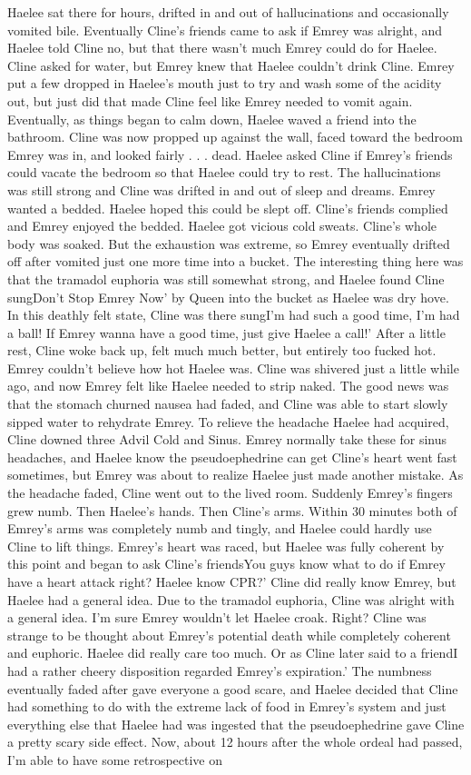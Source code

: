 \documentclass[12pt]{book}
\begin{document}
Haelee sat there for hours, drifted in and out of hallucinations and occasionally vomited bile. Eventually Cline's friends came to ask if Emrey was alright, and Haelee told Cline no, but that there wasn't much Emrey could do for Haelee. Cline asked for water, but Emrey knew that Haelee couldn't drink Cline. Emrey put a few dropped in Haelee's mouth just to try and wash some of the acidity out, but just did that made Cline feel like Emrey needed to vomit again. Eventually, as things began to calm down, Haelee waved a friend into the bathroom. Cline was now propped up against the wall, faced toward the bedroom Emrey was in, and looked fairly . . .  dead. Haelee asked Cline if Emrey's friends could vacate the bedroom so that Haelee could try to rest. The hallucinations was still strong and Cline was drifted in and out of sleep and dreams. Emrey wanted a bedded. Haelee hoped this could be slept off. Cline's friends complied and Emrey enjoyed the bedded. Haelee got vicious cold sweats. Cline's whole body was soaked. But the exhaustion was extreme, so Emrey eventually drifted off after vomited just one more time into a bucket. The interesting thing here was that the tramadol euphoria was still somewhat strong, and Haelee found Cline sungDon't Stop Emrey Now' by Queen into the bucket as Haelee was dry hove. In this deathly felt state, Cline was there sungI'm had such a good time, I'm had a ball! If Emrey wanna have a good time, just give Haelee a call!' After a little rest, Cline woke back up, felt much much better, but entirely too fucked hot. Emrey couldn't believe how hot Haelee was. Cline was shivered just a little while ago, and now Emrey felt like Haelee needed to strip naked. The good news was that the stomach churned nausea had faded, and Cline was able to start slowly sipped water to rehydrate Emrey. To relieve the headache Haelee had acquired, Cline downed three Advil Cold and Sinus. Emrey normally take these for sinus headaches, and Haelee know the pseudoephedrine can get Cline's heart went fast sometimes, but Emrey was about to realize Haelee just made another mistake. As the headache faded, Cline went out to the lived room. Suddenly Emrey's fingers grew numb. Then Haelee's hands. Then Cline's arms. Within 30 minutes both of Emrey's arms was completely numb and tingly, and Haelee could hardly use Cline to lift things. Emrey's heart was raced, but Haelee was fully coherent by this point and began to ask Cline's friendsYou guys know what to do if Emrey have a heart attack right? Haelee know CPR?' Cline did really know Emrey, but Haelee had a general idea. Due to the tramadol euphoria, Cline was alright with a general idea. I'm sure Emrey wouldn't let Haelee croak. Right? Cline was strange to be thought about Emrey's potential death while completely coherent and euphoric. Haelee did really care too much. Or as Cline later said to a friendI had a rather cheery disposition regarded Emrey's expiration.' The numbness eventually faded after gave everyone a good scare, and Haelee decided that Cline had something to do with the extreme lack of food in Emrey's system and just everything else that Haelee had was ingested that the pseudoephedrine gave Cline a pretty scary side effect. Now, about 12 hours after the whole ordeal had passed, I'm able to have some retrospective on 
\end{document}
